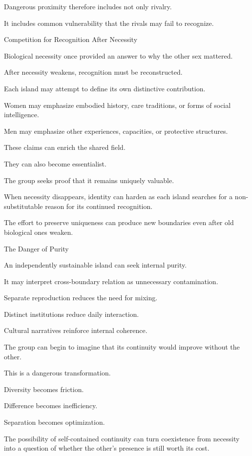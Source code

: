 Dangerous proximity therefore includes not only rivalry.

It includes common vulnerability that the rivals may fail to recognize.

Competition for Recognition After Necessity

Biological necessity once provided an answer to why the other sex mattered.

After necessity weakens, recognition must be reconstructed.

Each island may attempt to define its own distinctive contribution.

Women may emphasize embodied history, care traditions, or forms of social intelligence.

Men may emphasize other experiences, capacities, or protective structures.

These claims can enrich the shared field.

They can also become essentialist.

The group seeks proof that it remains uniquely valuable.

When necessity disappears, identity can harden as each island searches for a non-substitutable reason for its continued recognition.

The effort to preserve uniqueness can produce new boundaries even after old biological ones weaken.

The Danger of Purity

An independently sustainable island can seek internal purity.

It may interpret cross-boundary relation as unnecessary contamination.

Separate reproduction reduces the need for mixing.

Distinct institutions reduce daily interaction.

Cultural narratives reinforce internal coherence.

The group can begin to imagine that its continuity would improve without the other.

This is a dangerous transformation.

Diversity becomes friction.

Difference becomes inefficiency.

Separation becomes optimization.

The possibility of self-contained continuity can turn coexistence from necessity into a question of whether the other’s presence is still worth its cost.

